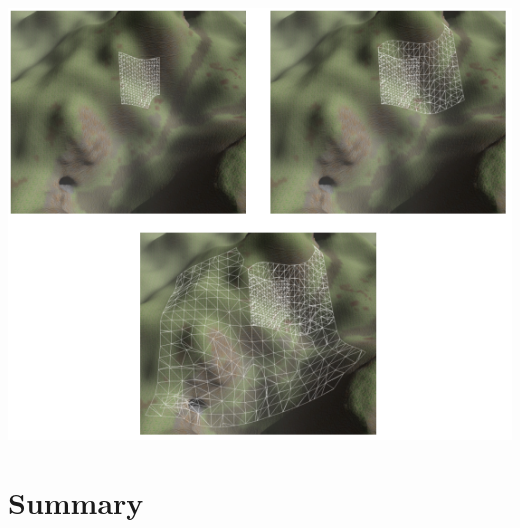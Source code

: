 \documentclass[10pt]{report}
\begin{document}
		\begin{minipage}{\textwidth}
			\centering
			\includegraphics[scale=.75]{voxel-detail}
			\label{fig:voxel-layered-mapping}
		\end{minipage}
			
	\vspace{10pt}
	\let\clearpage\relax
	\chapter{Summary}
		
\end{document}
